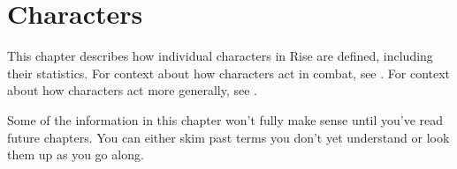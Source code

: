 \chapter{Characters}\label{Characters}

This chapter describes how individual characters in Rise are defined, including their statistics.
For context about how characters act in combat, see .
For context about how characters act more generally, see .

Some of the information in this chapter won't fully make sense until you've read future chapters.
You can either skim past terms you don't yet understand or look them up as you go along.


















